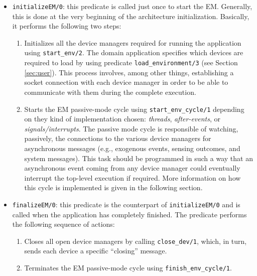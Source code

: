 \documentclass[11pt]{article}
\begin{document}
\begin{itemize}
\item \texttt{initializeEM/0}: this predicate is called just once to start the
EM. Generally, this is done at the very beginning of the architecture
initialization. Basically, it performs the following two steps:
\begin{enumerate}
\item Initializes all the device managers required for running the
    application using \texttt{start\_env/2}. The domain application specifies
    which devices are required to load by using predicate
    \texttt{load\_environment/3} (see Section \ref{sec:user}).
    This process involves, among other things, establishing a socket
    connection with each device manager in order to be able to communicate
    with them during the complete execution.
    
 \item Starts the EM passive-mode cycle using \texttt{start\_env\_cycle/1} 
depending on they kind of implementation chosen: \textit{threads},
\textit{after-events}, or \textit{signals/interrupts}. The passive mode cycle is
responsible of watching, passively, the 
  connections to the various device managers for asynchronous messages
  (e.g., exogenous events, sensing outcomes, and system messages). This task
  should be programmed in such a  way that an asynchronous event coming from any
  device manager could eventually interrupt the top-level execution if
  required. 
  More information on how this cycle is implemented is given in the following
  section.
\end{enumerate}
  
  
\item \texttt{finalizeEM/0}: this predicate is the counterpart of
\texttt{initializeEM/0} and is called when the application has completely
finished. The predicate performs the following sequence of actions:
\begin{enumerate}
  \item Closes all open device managers by calling \texttt{close\_dev/1}, which,
  in turn, sends each device a specific ``closing'' message.

\item Terminates the EM passive-mode cycle using \texttt{finish\_env\_cycle/1}. 
\end{enumerate}
  

\end{itemize}
\end{document}
